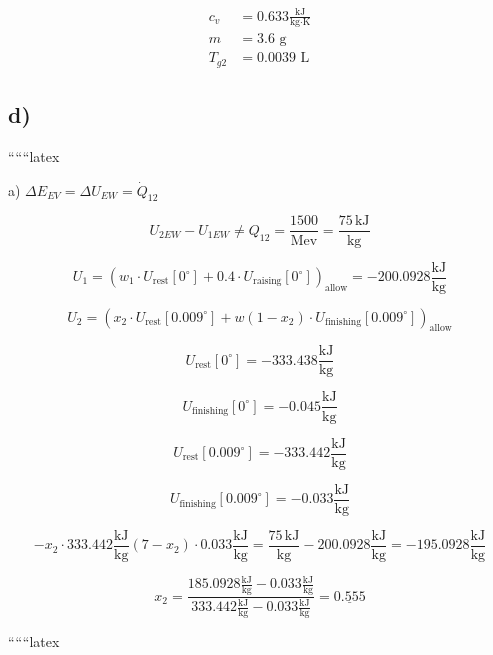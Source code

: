 \begin{align*}
c_v &= 0.633 \frac{\text{kJ}}{\text{kg} \cdot \text{K}} \\
m &= 3.6 \text{ g} \\
T_{g2} &= 0.0039 \text{ L}
\end{align*}

\subsection*{d)}

``````latex

a) \(\Delta E_{EV} = \Delta U_{EW} = \dot{Q}_{12}\)

\[
U_{2EW} - U_{1EW} \neq Q_{12} = \frac{1500}{\text{Mev}} = \frac{75 \, \text{kJ}}{\text{kg}}
\]

\[
U_1 = (w_1 \cdot U_{\text{rest}}[0^\circ] + 0.4 \cdot U_{\text{raising}}[0^\circ])_{\text{allow}} = -200.0928 \frac{\text{kJ}}{\text{kg}}
\]

\[
U_2 = \left( x_2 \cdot U_{\text{rest}}[0.009^\circ] + w(1 - x_2) \cdot U_{\text{finishing}}[0.009^\circ] \right)_{\text{allow}}
\]

\[
U_{\text{rest}}[0^\circ] = -333.438 \frac{\text{kJ}}{\text{kg}}
\]

\[
U_{\text{finishing}}[0^\circ] = -0.045 \frac{\text{kJ}}{\text{kg}}
\]

\[
U_{\text{rest}}[0.009^\circ] = -333.442 \frac{\text{kJ}}{\text{kg}}
\]

\[
U_{\text{finishing}}[0.009^\circ] = -0.033 \frac{\text{kJ}}{\text{kg}}
\]

\[
- x_2 \cdot 333.442 \frac{\text{kJ}}{\text{kg}} (7 - x_2) \cdot 0.033 \frac{\text{kJ}}{\text{kg}} = \frac{75 \, \text{kJ}}{\text{kg}} - 200.0928 \frac{\text{kJ}}{\text{kg}} = -195.0928 \frac{\text{kJ}}{\text{kg}}
\]

\[
x_2 = \frac{185.0928 \frac{\text{kJ}}{\text{kg}} - 0.033 \frac{\text{kJ}}{\text{kg}}}{333.442 \frac{\text{kJ}}{\text{kg}} - 0.033 \frac{\text{kJ}}{\text{kg}}} = \underline{0.555}
\]

``````latex


